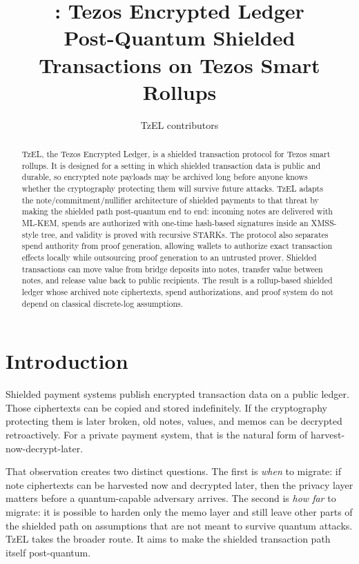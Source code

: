 \documentclass[11pt]{article}
\title{\TzEL: Tezos Encrypted Ledger\\
\large Post-Quantum Shielded Transactions on Tezos Smart Rollups}
\author{TzEL contributors}
\date{}
\newcommand{\TzEL}{TzEL}
\begin{document}
\maketitle

\begin{abstract}
\TzEL{}, the Tezos Encrypted Ledger, is a shielded transaction protocol for
Tezos smart rollups. It is designed for a setting in which shielded transaction
data is public and durable, so encrypted note payloads may be archived long
before anyone knows whether the cryptography protecting them will survive
future attacks. \TzEL{} adapts the note/commitment/nullifier architecture of
shielded payments to that threat by making the shielded path post-quantum end
to end: incoming notes are delivered with ML-KEM, spends are authorized with
one-time hash-based signatures inside an XMSS-style tree, and validity is
proved with recursive STARKs. The protocol also separates spend authority from
proof generation, allowing wallets to authorize exact transaction effects
locally while outsourcing proof generation to an untrusted prover. Shielded
transactions can move value from bridge deposits into notes, transfer value
between notes, and release value back to public recipients. The result is a
rollup-based shielded ledger whose archived note ciphertexts, spend
authorizations, and proof system do not depend on classical discrete-log
assumptions.
\end{abstract}

\section{Introduction}

Shielded payment systems publish encrypted transaction data on a public ledger.
Those ciphertexts can be copied and stored indefinitely. If the cryptography
protecting them is later broken, old notes, values, and memos can be decrypted
retroactively. For a private payment system, that is the natural form of
harvest-now-decrypt-later.

That observation creates two distinct questions. The first is \emph{when} to
migrate: if note ciphertexts can be harvested now and decrypted later, then the
privacy layer matters before a quantum-capable adversary arrives. The second is
\emph{how far} to migrate: it is possible to harden only the memo layer and
still leave other parts of the shielded path on assumptions that are not meant
to survive quantum attacks. \TzEL{} takes the broader route. It aims to make
the shielded transaction path itself post-quantum.
\end{document}
